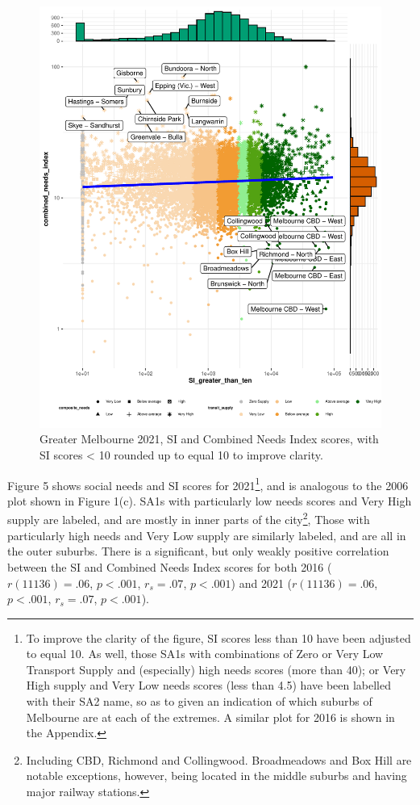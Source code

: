 \documentclass[preprint, 3p,
authoryear]{elsarticle} %
\begin{document}
\begin{figure}
\centering
\includegraphics{ReynoldsCurrieQu2024_files/figure-latex/Greater_Melbourne_2021_needs_gap_scatterplot_figure-1.pdf}
\caption{Greater Melbourne 2021, SI and Combined Needs Index scores,
with SI scores \textless{} 10 rounded up to equal 10 to improve
clarity.}
\end{figure}

Figure 5 shows social needs and SI scores for 2021\footnote{To improve
  the clarity of the figure, SI scores less than 10 have been adjusted
  to equal 10. As well, those SA1s with combinations of Zero or Very Low
  Transport Supply and (especially) high needs scores (more than 40); or
  Very High supply and Very Low needs scores (less than 4.5) have been
  labelled with their SA2 name, so as to given an indication of which
  suburbs of Melbourne are at each of the extremes. A similar plot for
  2016 is shown in the Appendix.}, and is analogous to the 2006 plot
shown in Figure 1(c). SA1s with particularly low needs scores and Very
High supply are labeled, and are mostly in inner parts of the
city\footnote{Including CBD, Richmond and Collingwood. Broadmeadows and
  Box Hill are notable exceptions, however, being located in the middle
  suburbs and having major railway stations.}, Those with particularly
high needs and Very Low supply are similarly labeled, and are all in the
outer suburbs. There is a significant, but only weakly positive
correlation between the SI and Combined Needs Index scores for both 2016
(\(r(11136) = .06\), \(p < .001\), \(r_s =.07\), \(p < .001\)) and 2021
(\(r(11136) = .06\), \(p < .001\), \(r_s =.07\), \(p < .001\)).
\end{document}
